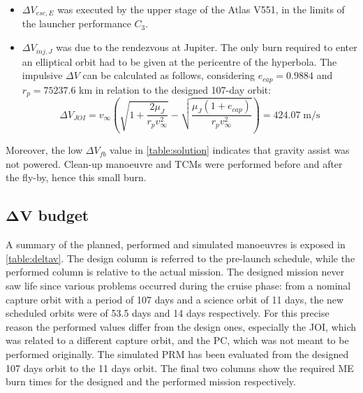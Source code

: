 \begin{itemize}
    \item $\Delta V_{esc,E}$ was executed by the upper stage of the Atlas V551, in the limits of the launcher performance $C_3$.
    \item $\Delta V_{inj,J}$ was due to the rendezvous at Jupiter. The only burn required to enter an elliptical orbit had to be given at the pericentre of the hyperbola. The impulsive $\Delta V$ can be calculated as follows, considering $e_{cap} = 0.9884$ and $r_p = 75237.6$ km in relation to the designed 107-day orbit: 
    \begin{equation}
        \Delta V_{JOI} = v_{\infty} \left( \sqrt{1 + \frac{2\mu_{J}}{r_p v_{\infty}^2}} - \sqrt{\frac{\mu_{J} (1 + e_{cap})}{r_p v_{\infty}^2}}\right) =  424.07 \; \textrm{m/s}
    \end{equation}
\end{itemize}
Moreover, the low $\Delta V_{fb}$ value in \autoref{table:solution} indicates that gravity assist was not powered. Clean-up manoeuvre and TCMs were performed before and after the fly-by, hence this small burn.

\subsection
[\texorpdfstring{$\Delta V$}{Delta-V} budget]
{\texorpdfstring{$\boldsymbol{\Delta V}$}{Delta-V} budget}
\label{subsec:deltav_budget}

A summary of the planned, performed and simulated manoeuvres is exposed in \autoref{table:deltav}. The design column is referred to the pre-launch schedule, while the performed column is relative to the actual mission.
The designed mission never saw life since various problems occurred during the cruise phase: from a nominal capture orbit with a period of 107 days and a science orbit of 11 days, the new scheduled orbits were of 53.5 days and 14 days respectively.
For this precise reason the performed values differ from the design ones, especially the JOI, which was related to a different capture orbit, and the PC, which was not meant to be performed originally. The simulated PRM has been evaluated from the designed 107 days orbit to the 11 days orbit. The final two columns show the required ME burn times for the designed and the performed mission respectively.

